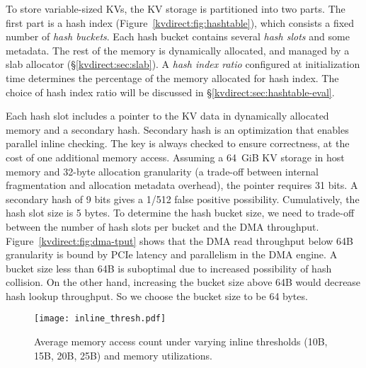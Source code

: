 To store variable-sized KVs, the KV storage is partitioned into two parts. The first part is a hash index (Figure~\ref{kvdirect:fig:hashtable}), which consists a fixed number of \textit{hash buckets}. Each hash bucket contains several \textit{hash slots} and some metadata. The rest of the memory is dynamically allocated, and managed by a slab allocator (\S\ref{kvdirect:sec:slab}).
A \textit{hash index ratio} configured at initialization time determines the percentage of the memory allocated for hash index.
The choice of hash index ratio will be discussed in \S\ref{kvdirect:sec:hashtable-eval}.


Each hash slot includes a pointer to the KV data in dynamically allocated memory and a secondary hash.
Secondary hash is an optimization that enables parallel inline checking. The key is always checked to ensure correctness, at the cost of one additional memory access.
Assuming a 64~GiB KV storage in host memory and 32-byte allocation granularity (a trade-off between internal fragmentation and allocation metadata overhead), the pointer requires 31 bits.
A secondary hash of 9 bits gives a 1/512 false positive possibility.
Cumulatively, the hash slot size is 5 bytes.
To determine the hash bucket size, we need to trade-off between the number of hash slots per bucket and the DMA throughput.
Figure~\ref{kvdirect:fig:dma-tput} shows that the DMA read throughput below 64B granularity is bound by PCIe latency and parallelism in the DMA engine.
A bucket size less than 64B is suboptimal due to increased possibility of hash collision.
On the other hand, increasing the bucket size above 64B would decrease hash lookup throughput.
So we choose the bucket size to be 64 bytes.

\begin{figure}[t]
\centering
\texttt{[image: inline\_thresh.pdf]}
\caption{Average memory access count under varying inline thresholds (10B, 15B, 20B, 25B) and memory utilizations.}
\label{kvdirect:fig:inline-offline}

\end{figure}

